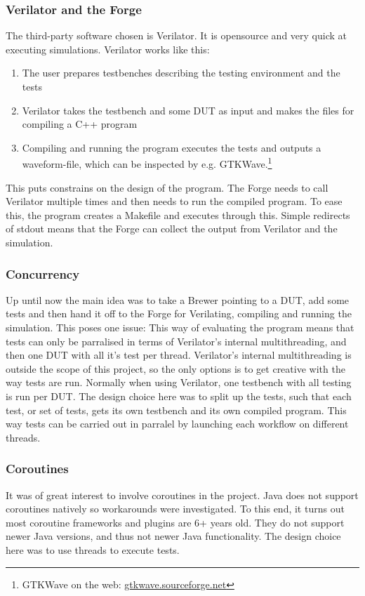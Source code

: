 \subsubsection{Verilator and the Forge}
The third-party software chosen is Verilator. It is opensource and very quick at executing simulations. Verilator works like this:
\begin{enumerate}
    \item The user prepares testbenches describing the testing environment and the tests
    \item Verilator takes the testbench and some DUT as input and makes the files for compiling a C++ program
    \item Compiling and running the program executes the tests and outputs a waveform-file, which can be inspected by e.g. GTKWave.\footnote{GTKWave on the web: \href{https://gtkwave.sourceforge.net/}{gtkwave.sourceforge.net}}
\end{enumerate}

This puts constrains on the design of the program. The Forge needs to call Verilator multiple times and then needs to run the compiled program. To ease this, the program creates a Makefile and executes through this. Simple redirects of stdout means that the Forge can collect the output from Verilator and the simulation. 
\subsubsection{Concurrency}
Up until now the main idea was to take a Brewer pointing to a DUT, add some tests and then hand it off to the Forge for Verilating, compiling and running the simulation. This poses one issue: This way of evaluating the program means that tests can only be parralised in terms of Verilator's internal multithreading, and then one DUT with all it's test per thread. Verilator's internal multithreading is outside the scope of this project, so the only options is to get creative with the way tests are run. Normally when using Verilator, one testbench with all testing is run per DUT. The design choice here was to split up the tests, such that each test, or set of tests, gets its own testbench and its own compiled program. This way tests can be carried out in parralel by launching each workflow on different threads.
\subsubsection{Coroutines}
It was of great interest to involve coroutines in the project. Java does not support coroutines natively so workarounds were investigated. To this end, it turns out most coroutine frameworks and plugins are 6+ years old. They do not support newer Java versions, and thus not newer Java functionality. The design choice here was to use threads to execute tests.
